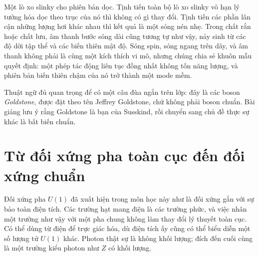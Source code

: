\begin{classroomqa}
\end{classroomqa}

Một lò xo slinky cho phiên bản dọc. Tịnh tiến toàn bộ lò xo slinky vô hạn lý tưởng hóa dọc theo trục của nó thì không có gì thay đổi. Tịnh tiến các phần lân cận những lượng hơi khác nhau thì kết quả là một sóng nén nhẹ. Trong chất rắn hoặc chất lưu, âm thanh bước sóng dài cũng tương tự như vậy, nảy sinh từ các độ dời tập thể và các biến thiên mật độ. Sóng spin, sóng ngang trên dây, và âm thanh không phải là cùng một kích thích vi mô, nhưng chúng chia sẻ khuôn mẫu quyết định: một phép tác động liên tục đồng nhất không tốn năng lượng, và phiên bản biến thiên chậm của nó trở thành một mode mềm.

Thuật ngữ đủ quan trọng để có một câu đùa ngắn trên lớp: đây là các boson \emph{Goldstone}, được đặt theo tên Jeffrey Goldstone, chứ không phải boson chuẩn. Bài giảng lưu ý rằng Goldstone là bạn của Susskind, rồi chuyển sang chủ đề thực sự khác là bất biến chuẩn.

\section{Từ đối xứng pha toàn cục đến đối xứng chuẩn}

Đối xứng pha \(U(1)\) đã xuất hiện trong môn học này như là đối xứng gắn với sự bảo toàn điện tích. Các trường hạt mang điện là các trường phức, và việc nhân một trường như vậy với một pha chung không làm thay đổi lý thuyết toàn cục. Có thể dùng từ điện để trực giác hóa, dù điện tích ấy cũng có thể biểu diễn một số lượng tử \(U(1)\) khác. Photon thật sự là không khối lượng; đích đến cuối cùng là một trường kiểu photon như \(Z\) có khối lượng.

